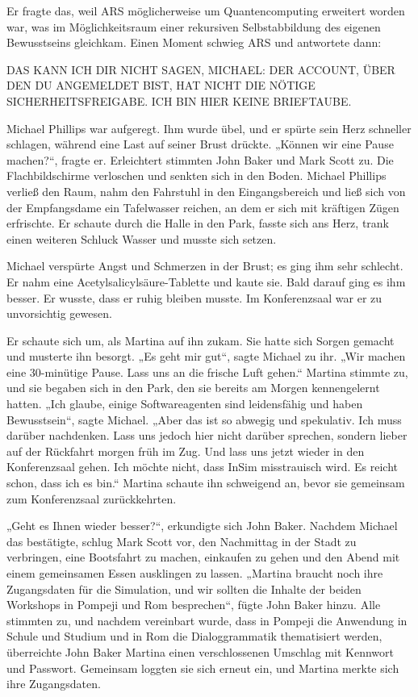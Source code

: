\documentclass[
]{article}
\begin{document}
Er fragte das, weil ARS möglicherweise um Quantencomputing erweitert
worden war, was im Möglichkeitsraum einer rekursiven Selbstabbildung des
eigenen Bewusstseins gleichkam. Einen Moment schwieg ARS und antwortete
dann:

DAS KANN ICH DIR NICHT SAGEN, MICHAEL: DER ACCOUNT, ÜBER DEN DU
ANGEMELDET BIST, HAT NICHT DIE NÖTIGE SICHERHEITSFREIGABE. ICH BIN HIER
KEINE BRIEFTAUBE.

Michael Phillips war aufgeregt. Ihm wurde übel, und er spürte sein Herz
schneller schlagen, während eine Last auf seiner Brust drückte. „Können
wir eine Pause machen?{\kern0pt}``, fragte er. Erleichtert stimmten John
Baker und Mark Scott zu. Die Flachbildschirme verloschen und senkten
sich in den Boden. Michael Phillips verließ den Raum, nahm den Fahrstuhl
in den Eingangsbereich und ließ sich von der Empfangsdame ein
Tafelwasser reichen, an dem er sich mit kräftigen Zügen erfrischte. Er
schaute durch die Halle in den Park, fasste sich ans Herz, trank einen
weiteren Schluck Wasser und musste sich setzen.

Michael verspürte Angst und Schmerzen in der Brust; es ging ihm sehr
schlecht. Er nahm eine Acetylsalicylsäure-Tablette und kaute sie. Bald
darauf ging es ihm besser. Er wusste, dass er ruhig bleiben musste. Im
Konferenzsaal war er zu unvorsichtig gewesen.

Er schaute sich um, als Martina auf ihn zukam. Sie hatte sich Sorgen
gemacht und musterte ihn besorgt. „Es geht mir gut``, sagte Michael zu
ihr. „Wir machen eine 30-minütige Pause. Lass uns an die frische Luft
gehen.`` Martina stimmte zu, und sie begaben sich in den Park, den sie
bereits am Morgen kennengelernt hatten. „Ich glaube, einige
Softwareagenten sind leidensfähig und haben Bewusstsein``, sagte
Michael. „Aber das ist so abwegig und spekulativ. Ich muss darüber
nachdenken. Lass uns jedoch hier nicht darüber sprechen, sondern lieber
auf der Rückfahrt morgen früh im Zug. Und lass uns jetzt wieder in den
Konferenzsaal gehen. Ich möchte nicht, dass InSim misstrauisch wird. Es
reicht schon, dass ich es bin.`` Martina schaute ihn schweigend an,
bevor sie gemeinsam zum Konferenzsaal zurückkehrten.

„Geht es Ihnen wieder besser?{\kern0pt}``, erkundigte sich John Baker.
Nachdem Michael das bestätigte, schlug Mark Scott vor, den Nachmittag in
der Stadt zu verbringen, eine Bootsfahrt zu machen, einkaufen zu gehen
und den Abend mit einem gemeinsamen Essen ausklingen zu lassen. „Martina
braucht noch ihre Zugangsdaten für die Simulation, und wir sollten die
Inhalte der beiden Workshops in Pompeji und Rom besprechen``, fügte John
Baker hinzu. Alle stimmten zu, und nachdem vereinbart wurde, dass in
Pompeji die Anwendung in Schule und Studium und in Rom die
Dialoggrammatik thematisiert werden, überreichte John Baker Martina
einen verschlossenen Umschlag mit Kennwort und Passwort. Gemeinsam
loggten sie sich erneut ein, und Martina merkte sich ihre Zugangsdaten.
\end{document}
